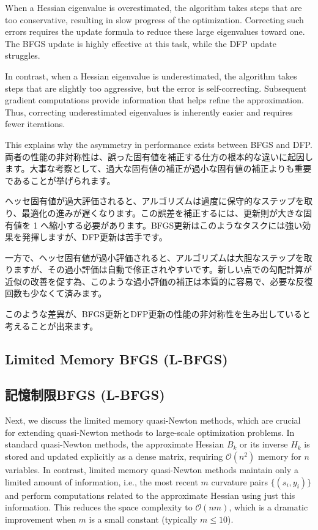 \documentclass[0_main]{subfiles}
\begin{document}
    When a Hessian eigenvalue is overestimated, the algorithm takes steps that are too conservative, resulting in slow progress of the optimization. Correcting such errors requires the update formula to reduce these large eigenvalues toward one. The BFGS update is highly effective at this task, while the DFP update struggles.

    In contrast, when a Hessian eigenvalue is underestimated, the algorithm takes steps that are slightly too aggressive, but the error is self-correcting. Subsequent gradient computations provide information that helps refine the approximation. Thus, correcting underestimated eigenvalues is inherently easier and requires fewer iterations.

    This explains why the asymmetry in performance exists between BFGS and DFP.
\else
    両者の性能の非対称性は、誤った固有値を補正する仕方の根本的な違いに起因します。大事な考察として、過大な固有値の補正が過小な固有値の補正よりも重要であることが挙げられます。

    ヘッセ固有値が過大評価されると、アルゴリズムは過度に保守的なステップを取り、最適化の進みが遅くなります。この誤差を補正するには、更新則が大きな固有値を 1 へ縮小する必要があります。BFGS更新はこのようなタスクには強い効果を発揮しますが、DFP更新は苦手です。

    一方で、ヘッセ固有値が過小評価されると、アルゴリズムは大胆なステップを取りますが、その過小評価は自動で修正されやすいです。新しい点での勾配計算が近似の改善を促す為、このような過小評価の補正は本質的に容易で、必要な反復回数も少なくて済みます。

    このような差異が、BFGS更新とDFP更新の性能の非対称性を生み出していると考えることが出来ます。
\fi


\ifEn
    \subsection{Limited Memory BFGS (L-BFGS)}
\else
    \subsection{記憶制限BFGS (L-BFGS)}
\fi

\ifEn
    Next, we discuss the limited memory quasi-Newton methods, which are crucial for extending quasi-Newton methods to large-scale optimization problems. In standard quasi-Newton methods, the approximate Hessian $B_k$ or its inverse $H_k$ is stored and updated explicitly as a dense matrix, requiring $\mathcal{O}(n^2)$ memory for $n$ variables. In contrast, limited memory quasi-Newton methods maintain only a limited amount of information, i.e., the most recent $m$ curvature pairs $\{(s_i,y_i)\}$ and perform computations related to the approximate Hessian using just this information. This reduces the space complexity to $\mathcal{O}(nm)$, which is a dramatic improvement when $m$ is a small constant (typically $m\le 10$).
\end{document}
